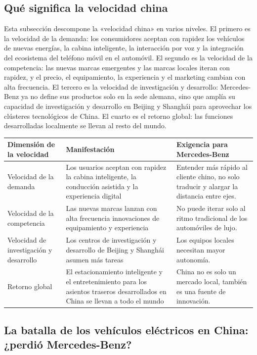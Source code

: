 \documentclass[a4paper]{article}
\begin{document}
\subsection{Qué significa la velocidad china}

Esta subsección descompone la «velocidad china» en varios niveles. El primero es la velocidad de la demanda: los consumidores aceptan con rapidez los vehículos de nuevas energías, la cabina inteligente, la interacción por voz y la integración del ecosistema del teléfono móvil en el automóvil. El segundo es la velocidad de la competencia: las nuevas marcas emergentes y las marcas locales iteran con rapidez, y el precio, el equipamiento, la experiencia y el marketing cambian con alta frecuencia. El tercero es la velocidad de investigación y desarrollo: Mercedes-Benz ya no define sus productos solo en la sede alemana, sino que amplía su capacidad de investigación y desarrollo en Beijing y Shanghái para aprovechar los clústeres tecnológicos de China. El cuarto es el retorno global: las funciones desarrolladas localmente se llevan al resto del mundo.

\noindent\begin{tabularx}{\textwidth}{p{}p{}X}
\toprule
Dimensión de la velocidad & Manifestación & Exigencia para Mercedes-Benz \\
\midrule
Velocidad de la demanda & Los usuarios aceptan con rapidez la cabina inteligente, la conducción asistida y la experiencia digital & Entender más rápido al cliente chino, no solo traducir y alargar la distancia entre ejes. \\
Velocidad de la competencia & Las nuevas marcas lanzan con alta frecuencia innovaciones de equipamiento y experiencia & No puede iterar solo al ritmo tradicional de los automóviles de lujo. \\
Velocidad de investigación y desarrollo & Los centros de investigación y desarrollo de Beijing y Shanghái asumen más tareas & Los equipos locales necesitan mayor autonomía. \\
Retorno global & El estacionamiento inteligente y el entretenimiento para los asientos traseros desarrollados en China se llevan a todo el mundo & China no es solo un mercado local, también es una fuente de innovación. \\
\bottomrule
\end{tabularx}

\subsection{La batalla de los vehículos eléctricos en China: ¿perdió Mercedes-Benz?}
\end{document}
